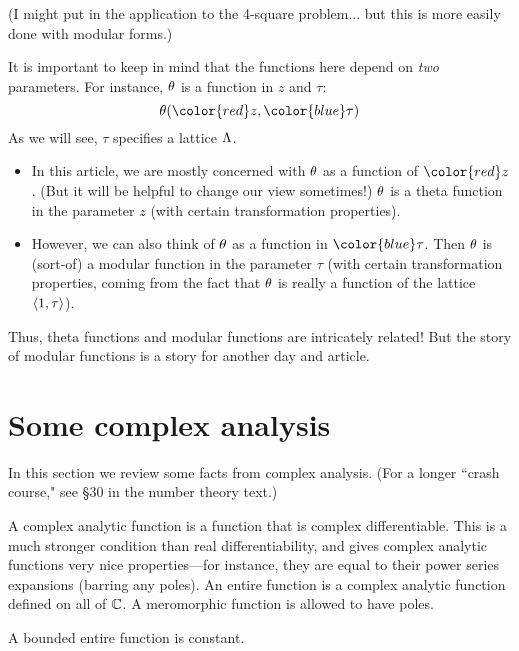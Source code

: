 (I might put in the application to the 4-square problem... but this is more easily done with modular forms.)

It is important to keep in mind that the functions here depend on {\it two} parameters. For instance, $\theta$ is a function in $z$ and $\tau$:
\[
\te({\color{red}z},{\color{blue}\tau})
\]
As we will see, $\tau$ specifies a lattice $\Lambda$.
\begin{itemize}
\item
In this article, %
we are mostly concerned with $\theta$ as a function of $\color{red}z$. (But it will be helpful to change our view sometimes!) $\theta$ is a {\color{red}theta function} in the parameter $z$ (with certain transformation properties).
\item
However, we can also think of $\theta$ as a function in $\color{blue}\tau$. Then $\theta$ is (sort-of) a {\color{blue}modular function} in the parameter $\tau$ (with certain transformation properties, coming from the fact that $\theta$ is really a function of the lattice $\left\langle {1,\tau}\right\rangle$). 
\end{itemize}
Thus, theta functions and modular functions are intricately related! But the story of modular functions is a story for another day and article.


\section{Some complex analysis}
In this section we review some facts from complex analysis. (For a longer ``crash course," see \S30 in the number theory text.) 

A complex analytic function is a function that is complex differentiable. This is a much stronger condition than real differentiability, and gives complex analytic functions very nice properties---for instance, they are equal to their power series expansions (barring any poles). An entire function is a complex analytic function defined on all of $\mathbb{C}$. A meromorphic function is allowed to have poles.

\begin{thm}[Liouville]
A bounded entire function is constant.
\end{thm}

